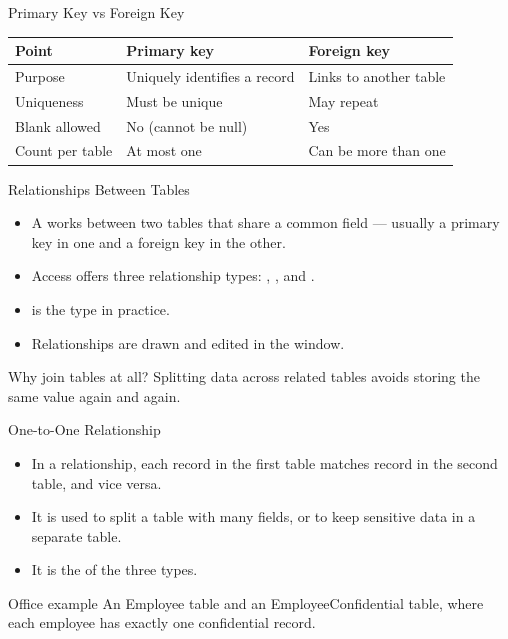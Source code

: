 \documentclass[aspectratio=169]{beamer}
\begin{document}
\begin{frame}{Primary Key vs Foreign Key}
  \begin{center}
    \begin{tabular}{p{}p{}p{}}
      \toprule
      \textbf{Point} & \textbf{Primary key} & \textbf{Foreign key} \\
      \midrule
      Purpose & Uniquely identifies a record & Links to another table \\
      Uniqueness & Must be unique & May repeat \\
      Blank allowed & No (cannot be null) & Yes \\
      Count per table & At most one & Can be more than one \\
      \bottomrule
    \end{tabular}
  \end{center}
  \vspace{0.2cm}
\end{frame}

\begin{frame}{Relationships Between Tables}
  \begin{itemize}
    \item A  works between two tables that share a common
      field --- usually a primary key in one and a foreign key in the other.
    \item Access offers three relationship types:
      , , and .
    \item {} is the  type in practice.
    \item Relationships are drawn and edited in the 
      window.
  \end{itemize}
  \begin{block}{Why join tables at all?}
    Splitting data across related tables avoids storing the same value again
    and again.
  \end{block}
\end{frame}

\begin{frame}{One-to-One Relationship}
  \begin{itemize}
    \item In a  relationship, each record in the first table
      matches  record in the second table, and vice versa.
    \item It is used to split a table with many fields, or to keep sensitive
      data in a separate table.
    \item It is the  of the three types.
  \end{itemize}
  \begin{exampleblock}{Office example}
    An Employee table and an EmployeeConfidential table, where each employee
    has exactly one confidential record.
  \end{exampleblock}
\end{frame}
\end{document}

